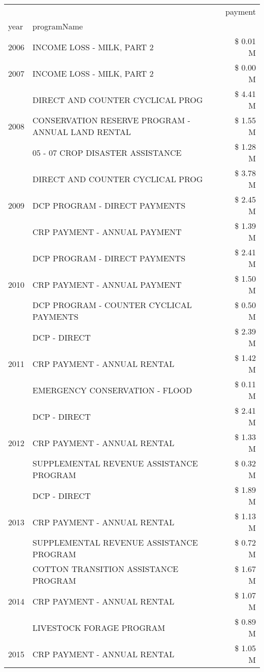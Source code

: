 \begin{tabular}{llr}
\toprule
 &  & payment \\
year & programName &  \\
\midrule
2006 & INCOME LOSS - MILK, PART 2 & \$ 0.01 M \\
\cline{1-3}
2007 & INCOME LOSS - MILK, PART 2 & \$ 0.00 M \\
\cline{1-3}
\multirow[t]{3}{*}{2008} & DIRECT AND COUNTER CYCLICAL PROG & \$ 4.41 M \\
 & CONSERVATION RESERVE PROGRAM - ANNUAL LAND RENTAL & \$ 1.55 M \\
 & 05 - 07 CROP DISASTER ASSISTANCE & \$ 1.28 M \\
\cline{1-3}
\multirow[t]{3}{*}{2009} & DIRECT AND COUNTER CYCLICAL PROG & \$ 3.78 M \\
 & DCP PROGRAM - DIRECT PAYMENTS & \$ 2.45 M \\
 & CRP PAYMENT - ANNUAL PAYMENT & \$ 1.39 M \\
\cline{1-3}
\multirow[t]{3}{*}{2010} & DCP PROGRAM - DIRECT PAYMENTS & \$ 2.41 M \\
 & CRP PAYMENT - ANNUAL PAYMENT & \$ 1.50 M \\
 & DCP PROGRAM - COUNTER CYCLICAL PAYMENTS & \$ 0.50 M \\
\cline{1-3}
\multirow[t]{3}{*}{2011} & DCP - DIRECT & \$ 2.39 M \\
 & CRP PAYMENT - ANNUAL RENTAL & \$ 1.42 M \\
 & EMERGENCY CONSERVATION - FLOOD & \$ 0.11 M \\
\cline{1-3}
\multirow[t]{3}{*}{2012} & DCP - DIRECT & \$ 2.41 M \\
 & CRP PAYMENT - ANNUAL RENTAL & \$ 1.33 M \\
 & SUPPLEMENTAL REVENUE ASSISTANCE PROGRAM & \$ 0.32 M \\
\cline{1-3}
\multirow[t]{3}{*}{2013} & DCP - DIRECT & \$ 1.89 M \\
 & CRP PAYMENT - ANNUAL RENTAL & \$ 1.13 M \\
 & SUPPLEMENTAL REVENUE ASSISTANCE PROGRAM & \$ 0.72 M \\
\cline{1-3}
\multirow[t]{3}{*}{2014} & COTTON TRANSITION ASSISTANCE PROGRAM & \$ 1.67 M \\
 & CRP PAYMENT - ANNUAL RENTAL & \$ 1.07 M \\
 & LIVESTOCK FORAGE PROGRAM & \$ 0.89 M \\
\cline{1-3}
\multirow[t]{3}{*}{2015} & CRP PAYMENT - ANNUAL RENTAL & \$ 1.05 M \\

\end{tabular}
